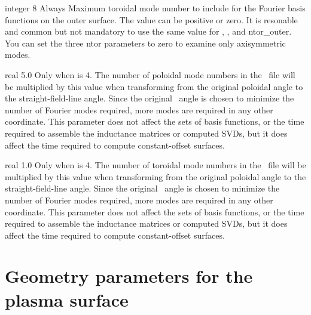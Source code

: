 \myhrule

{integer}
{8}
{Always}
{Maximum toroidal mode number to include for the Fourier basis functions on the outer surface. The value can be positive or zero.
It is resonable and common but not mandatory to use the same value for , , and {\ttfamily ntor\_outer}.
You can set the three {\ttfamily ntor} parameters to zero to examine only axisymmetric modes.}

\myhrule

{real}
{5.0}
{Only when  is 4.}
{The number of poloidal mode numbers in the \vmec~file will be multiplied by this value
when transforming from the original poloidal angle to the straight-field-line angle.
Since the original \vmec~angle is chosen to minimize the number of Fourier modes required,
more modes are required in any other coordinate.
This parameter does not affect the sets of basis functions,
or the time required to assemble the inductance matrices or
computed SVDs, but it does affect the time required to compute constant-offset surfaces.
}

\myhrule

{real}
{1.0}
{Only when  is 4.}
{The number of toroidal mode numbers in the \vmec~file will be multiplied by this value
when transforming from the original poloidal angle to the straight-field-line angle.
Since the original \vmec~angle is chosen to minimize the number of Fourier modes required,
more modes are required in any other coordinate.
This parameter does not affect the sets of basis functions,
or the time required to assemble the inductance matrices or
computed SVDs, but it does affect the time required to compute constant-offset surfaces.
}

\section{Geometry parameters for the plasma surface}

